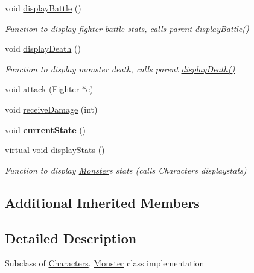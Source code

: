 \begin{DoxyCompactItemize}
\hypertarget{class_monster_a42e4c033144046eebe6cb502566423f7}{}\label{class_monster_a42e4c033144046eebe6cb502566423f7} 
void \hyperlink{class_monster_a42e4c033144046eebe6cb502566423f7}{display\+Battle} ()
\begin{DoxyCompactList}\small\item\em Function to display fighter battle stats, calls parent \hyperlink{class_monster_a42e4c033144046eebe6cb502566423f7}{display\+Battle()} \end{DoxyCompactList}\item 
\hypertarget{class_monster_a9ef924b193478c29baa90b0fa5845711}{}\label{class_monster_a9ef924b193478c29baa90b0fa5845711} 
void \hyperlink{class_monster_a9ef924b193478c29baa90b0fa5845711}{display\+Death} ()
\begin{DoxyCompactList}\small\item\em Function to display monster death, calls parent \hyperlink{class_monster_a9ef924b193478c29baa90b0fa5845711}{display\+Death()} \end{DoxyCompactList}\item 
void \hyperlink{class_monster_ad1805087dbd4472ace66a45f053aa250}{attack} (\hyperlink{class_fighter}{Fighter} $\ast$c)
\item 
void \hyperlink{class_monster_a8a0aadbb74bed6181adb79b58d67d0a8}{receive\+Damage} (int)
\item 
\hypertarget{class_monster_a2e5fc90efefa02d77c3645f6c7768d88}{}\label{class_monster_a2e5fc90efefa02d77c3645f6c7768d88} 
void {\bfseries current\+State} ()
\item 
\hypertarget{class_monster_a7dca19cf268fa2a8602b0ccbfe1eda09}{}\label{class_monster_a7dca19cf268fa2a8602b0ccbfe1eda09} 
virtual void \hyperlink{class_monster_a7dca19cf268fa2a8602b0ccbfe1eda09}{display\+Stats} ()
\begin{DoxyCompactList}\small\item\em Function to display \hyperlink{class_monster}{Monster}\textquotesingle{}s stats (calls Character\textquotesingle{}s displaystats) \end{DoxyCompactList}\end{DoxyCompactItemize}
\subsection*{Additional Inherited Members}


\subsection{Detailed Description}
Subclass of \hyperlink{class_characters}{Characters}, \textquotesingle{}\hyperlink{class_monster}{Monster}\textquotesingle{} class implementation 


